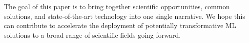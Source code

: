 The goal of this paper is to bring together scientific opportunities, common solutions,
and state-of-the-art technology into one single narrative. 
We hope this can contribute to accelerate the deployment of potentially transformative ML solutions to a broad range of scientific fields going forward. 






